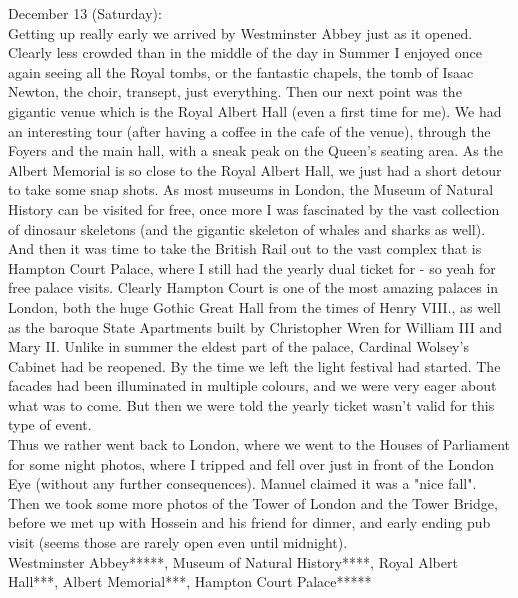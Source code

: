 December 13 (Saturday):\\
Getting up really early we arrived by Westminster Abbey just as it opened. Clearly less crowded than in the middle of the day in Summer I enjoyed once again seeing all the Royal tombs, or the fantastic chapels, the tomb of Isaac Newton, the choir, transept, just everything. Then our next point was the gigantic venue which is the Royal Albert Hall (even a first time for me). We had an interesting tour (after having a coffee in the cafe of the venue), through the Foyers and the main hall, with a sneak peak on the Queen's seating area. As the Albert Memorial is so close to the Royal Albert Hall, we just had a short detour to take some snap shots. As most museums in London, the Museum of Natural History can be visited for free, once more I was fascinated by the vast collection of dinosaur skeletons (and the gigantic skeleton of whales and sharks as well). \\ 
And then it was time to take the British Rail out to the vast complex that is Hampton Court Palace, where I still had the yearly dual ticket for - so yeah for free palace visits. Clearly Hampton Court is one of the most amazing palaces in London, both the huge Gothic Great Hall from the times of Henry VIII., as well as the baroque State Apartments built by Christopher Wren for William III and Mary II. Unlike in summer the eldest part of the palace, Cardinal Wolsey's Cabinet had be reopened. By the time we left the light festival had started. The facades had been illuminated in multiple colours, and we were very eager about what was to come. But then we were told the yearly ticket wasn't valid for this type of event.\\
Thus we rather went back to London, where we went to the Houses of Parliament for some night photos, where I tripped and fell over just in front of the London Eye (without any further consequences). Manuel claimed it was a "nice fall". Then we took some more photos of the Tower of London and the Tower Bridge, before we met up with Hossein and his friend for dinner, and early ending pub visit (seems those are rarely open even until midnight).\\

Westminster Abbey*****, Museum of Natural History****, Royal Albert Hall***, Albert Memorial***, Hampton Court Palace*****\\

